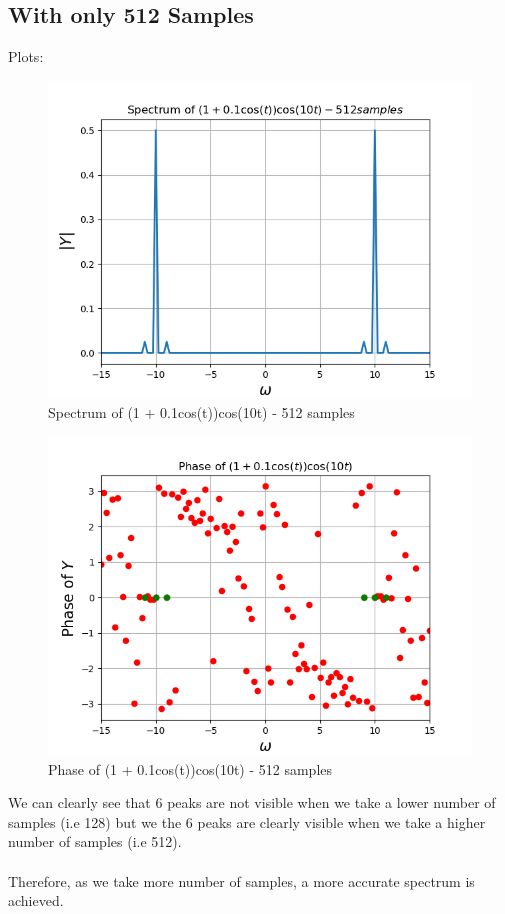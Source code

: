\documentclass[11pt]{article}
\begin{document}
\subsection{With only 512 Samples}
Plots:
\begin{figure}[H]
    \centering
    \includegraphics[scale = 0.75]{Figure_3a.png}
    \caption{Spectrum of (1 + 0.1cos(t))cos(10t) - 512 samples}
\end{figure}
\begin{figure}[H]
    \centering
    \includegraphics[scale = 0.75]{Figure_3b.png}
    \caption{Phase of (1 + 0.1cos(t))cos(10t) - 512 samples}
\end{figure}
We can clearly see that 6 peaks are not visible when we take a lower number of samples (i.e 128) but we the 6 peaks are clearly visible when we take a higher number of samples (i.e 512).\\~\\
Therefore, as we take more number of samples, a more accurate spectrum is achieved.
\end{document}

